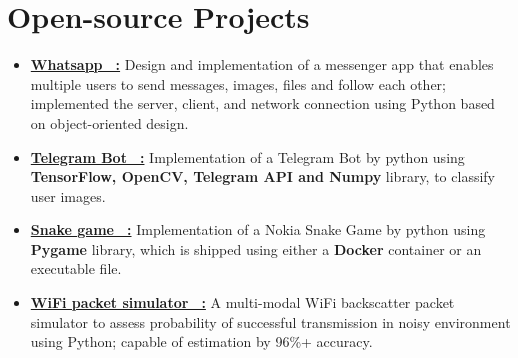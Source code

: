 \documentclass[letterpaper,12pt]{article}
\newcommand{\resumeItem}[2]{
  \item\small{
    \textbf{#1}{ #2 \vspace{-2pt}}
  }
}
\newcommand{\resumeSubItem}[2]{\resumeItem{#1}{#2}\vspace{-4pt}}
\newcommand{\resumeSubHeadingListStart}{\begin{itemize}[leftmargin=*]}
\newcommand{\resumeSubHeadingListEnd}{\end{itemize}}
\begin{document}
\section{\color{Mahogany}Open-source Projects}
  \resumeSubHeadingListStart
     \item{\textbf{ \href{https://github.com/farzan-dehbashi/Whatsapp}{ Whatsapp  \faGithub \, :}}} 
     Design and implementation of a messenger app that enables multiple users to send messages, images, files and follow each other; implemented the server, client, and network connection using Python based on object-oriented design. 
     \vspace{-2mm}
     \item{\href{https://github.com/farzan-dehbashi/telegram_bot}{\textbf{Telegram Bot \faGithub \, :}}}
     Implementation of a Telegram Bot by python using \textbf{TensorFlow, OpenCV, Telegram API and Numpy} library, to classify user images.
     \vspace{-2mm}
     \item{\href{https://github.com/farzan-dehbashi/snake_game}{\textbf{Snake game \faGithub \, :}}}
     Implementation of a Nokia Snake Game by python using \textbf{Pygame} library, which is shipped using either a \textbf{Docker} container or an executable file.
     \vspace{-2mm}
    \item{\href{https://github.com/farzan-dehbashi/WiFi-Backscattery-simulator/blob/master/README.md}{\textbf{ WiFi packet simulator \faGithub \, :}} A multi-modal WiFi backscatter packet simulator to assess probability of successful transmission in noisy environment using Python; capable of estimation by 96\%+ accuracy.}
     
    
   
  \resumeSubHeadingListEnd

 


\vspace{-8mm}
\end{document}

